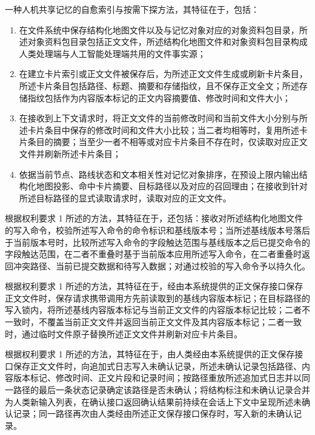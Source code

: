
\begin{claimitem}
\item 一种人机共享记忆的自愈索引与按需下探方法，其特征在于，包括：
\begin{enumerate}[label=(\arabic*),leftmargin=2.6em,itemsep=0.65em,topsep=0.55em]
\item 在文件系统中保存结构化地图文件以及与记忆对象对应的对象资料包目录，所述对象资料包目录包括正文文件，所述结构化地图文件和对象资料包目录构成人类处理端与人工智能处理端共用的文件事实源；
\item 在建立卡片索引或正文文件被保存后，为所述正文文件生成或刷新卡片条目，所述卡片条目包括路径、标题、摘要和存储指纹，且不保存正文全文；所述存储指纹包括作为内容版本标记的正文内容摘要值、修改时间和文件大小；
\item 在接收到上下文请求时，将正文文件的当前修改时间和当前文件大小分别与所述卡片条目中保存的修改时间和文件大小比较；当二者均相等时，复用所述卡片条目的摘要；当至少一者不相等或对应卡片条目不存在时，仅读取对应正文文件并刷新所述卡片条目；
\item 依据当前节点、路线状态和文本相关性对记忆对象排序，在预设上限内输出结构化地图投影、命中卡片摘要、目标路径以及对应的召回理由；在接收到针对所述目标路径的显式读取请求时，读取对应的正文文件。
\end{enumerate}

\item 根据权利要求 1 所述的方法，其特征在于，还包括：接收对所述结构化地图文件的写入命令，校验所述写入命令的命令标识和基线版本号；当所述基线版本号落后于当前版本号时，比较所述写入命令的字段触达范围与基线版本之后已提交命令的字段触达范围，在二者不重叠时基于当前版本应用所述写入命令，在二者重叠时返回冲突路径、当前已提交数据和待写入数据；对通过校验的写入命令予以持久化。

\item 根据权利要求 1 所述的方法，其特征在于，经由本系统提供的正文保存接口保存正文文件时，保存请求携带调用方先前读取到的基线内容版本标记；在目标路径的写入锁内，将所述基线内容版本标记与当前正文文件的内容版本标记比较；二者不一致时，不覆盖当前正文文件并返回当前正文文件及其内容版本标记；二者一致时，通过临时文件原子替换所述正文文件并刷新对应卡片条目。

\item 根据权利要求 1 所述的方法，其特征在于，由人类经由本系统提供的正文保存接口保存正文文件时，向追加式日志写入未确认记录，所述未确认记录包括路径、内容版本标记、修改时间、正文片段和记录时间；按路径重放所述追加式日志并以同一路径的最后一条状态记录确定该路径是否未确认；将结构标注和未确认记录合并为人类新输入列表，在确认接口返回确认结果前持续在会话上下文中呈现所述未确认记录；同一路径再次由人类经由所述正文保存接口保存时，写入新的未确认记录。


\end{claimitem}
